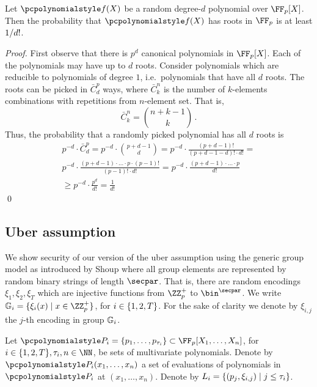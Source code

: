 \documentclass[runningheads,10pt]{llncs}
\begin{document}
\begin{lemma}
  \label{lem:root_prob}
  Let $\p{f}(X)$ be a random degree-$d$ polynomial over $\FF_p[X]$. Then the
  probability that $\p{f}(X)$ has roots in $\FF_p$ is at least $1 / d!$.
\end{lemma}
\begin{proof}
  First observe that there is $p^{d}$ canonical polynomials in $\FF_p[X]$.  Each
  of the polynomials may have up to $d$ roots. Consider polynomials which are
  reducible to polynomials of degree $1$, i.e.~polynomials that have all $d$
  roots. The roots can be picked in $\bar{C}^{p}_{d}$ ways, where
  $\bar{C}^{n}_{k}$ is the number of $k$-elements combinations with repetitions
  from $n$-element set. That is,
  \[
    \bar{C}^n_k = \binom{n + k - 1}{k}\,.
  \]
  Thus, the probability that a randomly picked polynomial has all $d$ roots is
  \begin{multline*}
    p^{-d} \cdot \bar{C}^p_d = p^{-d} \cdot \binom{p + d - 1}{d} =
    p^{-d} \cdot \frac{(p + d - 1)!}{(p + d - 1 - d)! \cdot d!} = \\
    p^{-d} \cdot \frac{(p + d - 1) \cdot \ldots \cdot p \cdot (p - 1)!}{(p - 1)!
      \cdot d!} = p^{-d} \cdot \frac{(p + d - 1)\cdot
      \ldots \cdot p}{d!} \\
    \geq p^{-d} \cdot {\frac{p^d}{d!}} = \frac{1}{d!}
  \end{multline*}
  \qed
\end{proof}

\subsection{Uber assumption}
\label{sec:uber_assumption}
We show security of our version of the uber assumption using the generic group
model as introduced by Shoup \cite{EC:Shoup97} where all group elements are
represented by random binary strings of length $\secpar$. That is, there are
random encodings $\xi_1, \xi_2, \xi_T$ which are injective functions from
$\ZZ_p^+$ to $\bin^{\secpar}$. We write
$\GRP_i = \smallset{\xi_i(x) \mid x \in \ZZ_p^+}$, for
$i \in \{1, 2, T\}$. For the sake of clarity  we denote by $\xi_{i, j}$
the $j$-th encoding in group $\mathbb{G}_i$.

Let
$\p{P}_i = \smallset{p_1, \ldots, p_{\tau_i}} \subset \FF_p[X_1, \ldots, X_n]$,
for $i \in \smallset{1, 2, T}, \tau_i, n \in \NN$, be sets of multivariate
polynomials. Denote by $\p{P}_i(x_1, \ldots, x_n)$ a set of evaluations of
polynomials in $\p{P_i}$ at $(x_1, \ldots, x_n)$. Denote by
$L_i = \{(p_j, \xi_{i, j}) \mid j \leq \tau_i\}$.
\end{document}
